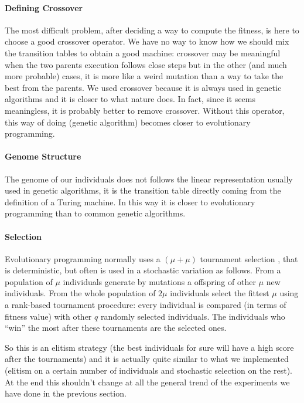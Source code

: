 \documentclass{report}
\begin{document}
\paragraph{Defining Crossover}
The most difficult problem, after deciding a way to compute the fitness, is here to choose a good crossover operator. We have no way to know how we should mix the transition tables to obtain a good machine: crossover may be meaningful when the two parents execution follows close steps but in the other (and much more probable) cases, it is more like a weird mutation than a way to take the best from the parents.
We used crossover because it is always used in genetic algorithms and it is closer to what nature does. In fact, since it seems meaningless, it is probably better to remove crossover. 
Without this operator, this way of doing (genetic algorithm) becomes closer to evolutionary programming.

\paragraph{Genome Structure}
The genome of our individuals does not follows the linear representation usually used in genetic algorithms, it is the transition table directly coming from the definition of a Turing machine. In this way it is closer to evolutionary programming than to common genetic algorithms.

\paragraph{Selection}
Evolutionary programming normally uses a $(\mu + \mu)$ tournament selection \cite{introtoec}, that is deterministic, but often is used in a stochastic variation as follows. From a population of $\mu$ individuals generate by mutations a offspring of other $\mu$ new individuals. From the whole population of $2\mu$ individuals select the fittest $\mu$ using a rank-based tournament procedure: every individual is compared (in terms of fitness value) with other $q$ randomly selected individuals. The individuals who ``win'' the most after these tournaments are the selected ones. 

So this is an elitism strategy (the best individuals for sure will have a high score after the tournaments) and it is actually quite similar to what we implemented (elitism on a certain number of individuals and stochastic selection on the rest). At the end this shouldn't change at all the general trend of the experiments we have done in the previous section.
\end{document}
